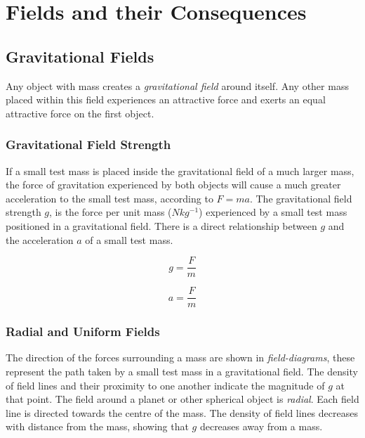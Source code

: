 \documentclass[12pt]{article}
\begin{document}
\section{Fields and their Consequences}
\label{sec:org7a19de0}
\subsection{Gravitational Fields}
\label{sec:orgb1160eb}

Any object with mass creates a \emph{gravitational field} around itself. Any other mass placed within this field experiences an attractive force and exerts an equal attractive force on the first object.

\subsubsection{Gravitational Field Strength}
\label{sec:orge840721}

If a small test mass is placed inside the gravitational field of a much larger mass, the force of gravitation experienced by both objects will cause a much greater acceleration to the small test mass, according to \(F = ma\). The gravitational field strength \(g\), is the force per unit mass (\(Nkg^{-1}\)) experienced by a small test mass positioned in a gravitational field. There is a direct relationship between \(g\) and the acceleration \(a\) of a small test mass.

\[g = \dfrac{F}{m}\]

\[a = \dfrac{F}{m}\]

\subsubsection{Radial and Uniform Fields}
\label{sec:org1850f96}

The direction of the forces surrounding a mass are shown in \emph{field-diagrams}, these represent the path taken by a small test mass in a gravitational field. The density of field lines and their proximity to one another indicate the magnitude of \(g\) at that point. The field around a planet or other spherical object is \emph{radial}. Each field line is directed towards the centre of the mass. The density of field lines decreases with distance from the mass, showing that \(g\) decreases away from a mass.
\end{document}
